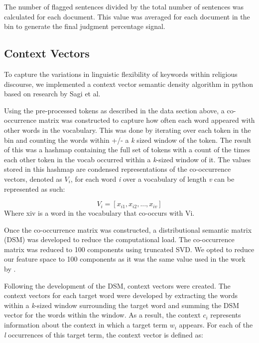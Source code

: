\documentclass[11pt]{article}
\begin{document}
The number of flagged sentences divided by the total number of sentences was calculated for each document. This value was averaged for each document in the bin to generate the final judgment percentage signal.

\subsection{Context Vectors}
\label{sect:cv}

To capture the variations in linguistic flexibility of keywords within religious discourse, we implemented a context vector semantic density algorithm in python based on research by Sagi et al. 

Using the pre-processed tokens as described in the data section above, a co-occurrence matrix was constructed to capture how often each word appeared with other words in the vocabulary. This was done by iterating over each token in the bin and counting the words within +/- a \textit{k} sized window of the token. The result of this was a hashmap containing the full set of tokens with a count of the times each other token in the vocab occurred within a \textit{k}-sized window of it.  The values stored in this hashmap are condensed representations of the co-occurrence vectors, denoted as $V_i$, for each word \textit{i} over a vocabulary of length \textit{v} can be represented as such:

\begin{equation} 
\label{eq:context vector}
V_{i}=[x_{i1},x_{i2},...,x_{iv}]
\end{equation}
Where xiv is a word in the vocabulary that co-occurs with Vi.

Once the co-occurrence matrix was constructed, a distributional semantic matrix (DSM) was developed to reduce the computational load. The co-occurrence matrix was reduced to 100 components using truncated SVD. We opted to reduce our feature space to 100 components as it was the same value used in the work by . 

Following the development of the DSM, context vectors were created. The context vectors for each target word were developed by extracting the words within a \textit{k}-sized window surrounding the target word and summing the DSM vector for the words within the window.  As a result, the context $c_i$ represents information about the context in which a target term $w_i$ appears. For each of the \textit{l} occurrences of this target term, the context vector is defined as:
\end{document}
